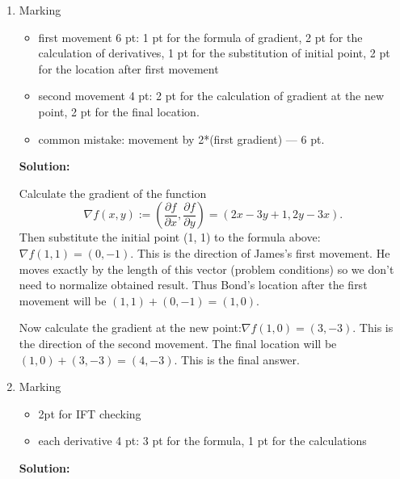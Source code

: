 \begin{enumerate}

\item Marking
\begin{itemize}
\item first movement 6 pt: 1 pt for the formula of gradient, 2 pt for the calculation of derivatives, 1 pt for the substitution of initial point, 2 pt for the location after first movement

\item second movement 4 pt: 2 pt for the calculation of gradient at the new point, 2 pt for the final location.

\item common mistake: movement by 2*(first gradient) --- 6 pt.
\end{itemize}
\textbf{Solution:}

Calculate the gradient of the function
\[
\nabla f(x,y):=(\frac{\partial f}{\partial x}, \frac{\partial f}{\partial y})=(2x-3y+1, 2y -3x).
\]
Then substitute the initial point (1, 1) to the formula above: $\nabla f(1,1)=(0,-1).$ This is the direction of James's first movement. He moves exactly by the length of this vector (problem conditions) so we don't need to normalize obtained result. Thus Bond's location after the first movement will be $(1,1)+(0,-1)=(1,0).$

Now calculate the gradient at the new point:$\nabla f(1,0)=(3,-3).$ This is the direction of the second movement. The final location will be $(1,0)+(3,-3)=(4,-3).$ This is the final answer.


\item Marking
\begin{itemize}
\item 2pt for IFT checking
\item each derivative 4 pt: 3 pt for the formula, 1 pt for the calculations
\end{itemize}
\textbf{Solution:}


\end{enumerate}
